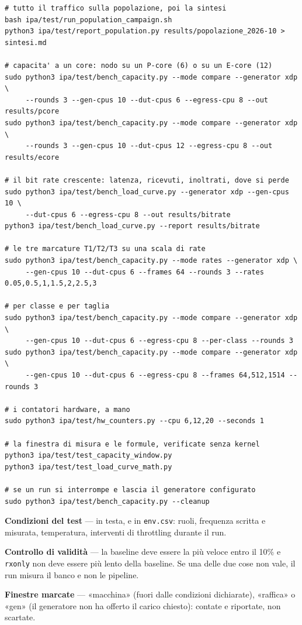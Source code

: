 \documentclass[11pt,a4paper,oneside]{report}
\begin{document}
\begin{lstlisting}
# tutto il traffico sulla popolazione, poi la sintesi
bash ipa/test/run_population_campaign.sh
python3 ipa/test/report_population.py results/popolazione_2026-10 > sintesi.md

# capacita' a un core: nodo su un P-core (6) o su un E-core (12)
sudo python3 ipa/test/bench_capacity.py --mode compare --generator xdp \
     --rounds 3 --gen-cpus 10 --dut-cpus 6 --egress-cpu 8 --out results/pcore
sudo python3 ipa/test/bench_capacity.py --mode compare --generator xdp \
     --rounds 3 --gen-cpus 10 --dut-cpus 12 --egress-cpu 8 --out results/ecore

# il bit rate crescente: latenza, ricevuti, inoltrati, dove si perde
sudo python3 ipa/test/bench_load_curve.py --generator xdp --gen-cpus 10 \
     --dut-cpus 6 --egress-cpu 8 --out results/bitrate
python3 ipa/test/bench_load_curve.py --report results/bitrate

# le tre marcature T1/T2/T3 su una scala di rate
sudo python3 ipa/test/bench_capacity.py --mode rates --generator xdp \
     --gen-cpus 10 --dut-cpus 6 --frames 64 --rounds 3 --rates 0.05,0.5,1,1.5,2,2.5,3

# per classe e per taglia
sudo python3 ipa/test/bench_capacity.py --mode compare --generator xdp \
     --gen-cpus 10 --dut-cpus 6 --egress-cpu 8 --per-class --rounds 3
sudo python3 ipa/test/bench_capacity.py --mode compare --generator xdp \
     --gen-cpus 10 --dut-cpus 6 --egress-cpu 8 --frames 64,512,1514 --rounds 3

# i contatori hardware, a mano
sudo python3 ipa/test/hw_counters.py --cpu 6,12,20 --seconds 1

# la finestra di misura e le formule, verificate senza kernel
python3 ipa/test/test_capacity_window.py
python3 ipa/test/test_load_curve_math.py

# se un run si interrompe e lascia il generatore configurato
sudo python3 ipa/test/bench_capacity.py --cleanup
\end{lstlisting}

\begin{prima}[Come si legge l'uscita]
\textbf{Condizioni del test} --- in testa, e in \texttt{env.csv}: ruoli, frequenza
scritta e misurata, temperatura, interventi di throttling durante il run.

\textbf{Controllo di validità} --- la baseline deve essere la più veloce entro il
10\% e \texttt{rxonly} non deve essere più lento della baseline. Se una delle due
cose non vale, il run misura il banco e non le pipeline.

\textbf{Finestre marcate} --- «macchina» (fuori dalle condizioni dichiarate),
«raffica» o «gen» (il generatore non ha offerto il carico chiesto): contate e
riportate, non scartate.
\end{prima}
\end{document}
